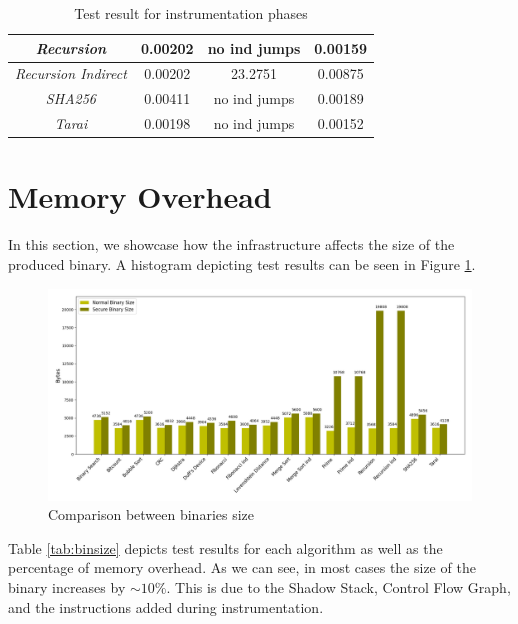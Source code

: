 \begin{table}
\begin{tabular}{|c|c|c|c|}
    \hline
    \textit{Recursion}                   & 0.00202                      & no ind jumps            & 0.00159                     \\
    \hline
    \textit{Recursion Indirect}          & 0.00202                      & 23.2751                 & 0.00875                     \\
    \hline
    \textit{SHA256}                      & 0.00411                      & no ind jumps            & 0.00189                     \\
    \hline
    \textit{Tarai}                       & 0.00198                      & no ind jumps            & 0.00152                     \\
    \hline
  \end{tabular}
  \caption{Test result for instrumentation phases}
  \label{tab:othertimes}
\end{table}

\section{Memory Overhead}
\label{sec:pa_memory}

In this section, we showcase how the infrastructure affects the size of the
produced binary. A histogram depicting test results can be seen in Figure \ref{fig:binsize}.

\begin{figure}[htbp]
  \centering
  \includegraphics[width=\linewidth]{images/size.png}
  \caption{Comparison between binaries size}
  \label{fig:binsize}
\end{figure}

Table \ref{tab:binsize} depicts test results for each algorithm as well as the
percentage of memory overhead. As we can see, in most cases the size of the
binary increases by $\sim 10\%$. This is due to the Shadow Stack, Control Flow
Graph, and the instructions added during instrumentation.

